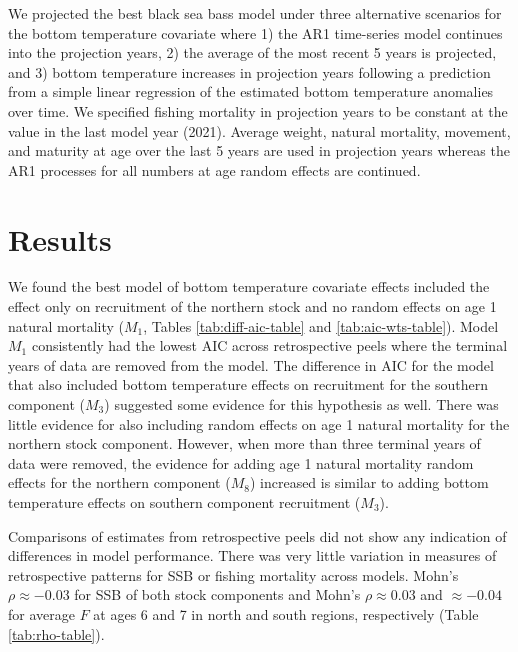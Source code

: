 \documentclass[
]{article}
\begin{document}
We projected the best black sea bass model under three alternative
scenarios for the bottom temperature covariate where 1) the AR1
time-series model continues into the projection years, 2) the average of
the most recent 5 years is projected, and 3) bottom temperature
increases in projection years following a prediction from a simple
linear regression of the estimated bottom temperature anomalies over
time. We specified fishing mortality in projection years to be constant
at the value in the last model year (2021). Average weight, natural
mortality, movement, and maturity at age over the last 5 years are used
in projection years whereas the AR1 processes for all numbers at age
random effects are continued.

\hypertarget{results}{%
\section*{Results}\label{results}}

We found the best model of bottom temperature covariate effects included
the effect only on recruitment of the northern stock and no random
effects on age 1 natural mortality (\(M_1\), Tables
\ref{tab:diff-aic-table} and \ref{tab:aic-wts-table}). Model \(M_1\)
consistently had the lowest AIC across retrospective peels where the
terminal years of data are removed from the model. The difference in AIC
for the model that also included bottom temperature effects on
recruitment for the southern component (\(M_3\)) suggested some evidence
for this hypothesis as well. There was little evidence for also
including random effects on age 1 natural mortality for the northern
stock component. However, when more than three terminal years of data
were removed, the evidence for adding age 1 natural mortality random
effects for the northern component (\(M_8\)) increased is similar to
adding bottom temperature effects on southern component recruitment
(\(M_3\)).

Comparisons of estimates from retrospective peels did not show any
indication of differences in model performance. There was very little
variation in measures of retrospective patterns for SSB or fishing
mortality across models. Mohn's \(\rho \approx -0.03\) for SSB of both
stock components and Mohn's \(\rho \approx 0.03\) and \(\approx -0.04\)
for average \(F\) at ages 6 and 7 in north and south regions,
respectively (Table \ref{tab:rho-table}).
\end{document}
